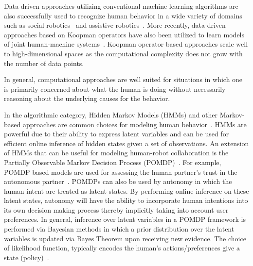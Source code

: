 \documentclass[12pt]{article}
\newcommand{\DGc}[1]{{\textbf{\color{blue}{#1}}}}
\begin{document}
Data-driven approaches utilizing conventional machine learning algorithms are also successfully used to recognize human behavior in a wide variety of domains such as social robotics~\cite{mataric2007socially} and assistive robotics~\cite{goil2013using}. More recently, data-driven approaches based on Koopman operators have also been utilized to learn models of joint human-machine systems~\cite{broad2018learning}. Koopman operator based approaches scale well to high-dimensional spaces as the computational complexity does not grow with the number of data points. 


In general, computational approaches are well suited for situations in which one is primarily concerned about what the human is doing without necessarily reasoning about the underlying causes for the behavior. 

In the algorithmic category, Hidden Markov Models (HMMs) and other Markov-based approaches are common choices for modeling human behavior~\cite{kelley2008understanding}. HMMs are powerful due to their ability to express latent variables and can be used for efficient online inference of hidden states given a set of observations. An extension of HMMs that can be useful for modeling human-robot collaboration is the Partially Observable Markov Decision Process (POMDP)~\cite{taha2011pomdp}. For example, POMDP based models are used for assessing the human partner's trust in the autonomous partner~\cite{chen2018planning}. 
POMDPs can also be used by autonomy in which the human intent are treated as latent states. By performing online inference on these latent states, autonomy will have the ability to incorporate human intentions into its own decision making process thereby implicitly taking into account user preferences. In general, inference over latent variables in a POMDP framework is performed via Bayesian methods in which a prior distribution over the latent variables is updated via Bayes Theorem upon receiving new evidence. The choice of likelihood function, typically encodes the human's actions/preferences give a state (policy)~\cite{dragan2012formalizing}. 
\end{document}
